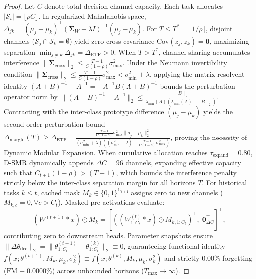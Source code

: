 \documentclass{article}
\begin{document}
\begin{proof}
Let $C$ denote total decision channel capacity. Each task allocates $|\mathcal{S}_t| = \lfloor \rho C \rfloor$. In regularized Mahalanobis space, $\Delta_{jk} = (\mu_j - \mu_k)^\top (\mathbf{\Sigma}_W + \lambda I)^{-1} (\mu_j - \mu_k)$. For $T \le T^* = \lfloor 1/\rho \rfloor$, disjoint channels ($\mathcal{S}_j \cap \mathcal{S}_k = \emptyset$) yield zero cross-covariance $\text{Cov}(z_j, z_k) = \mathbf{0}$, maximizing separation $\min_{j \ne k} \Delta_{jk} = \Delta_{\text{ETF}} > 0$. When $T > T^*$, channel sharing accumulates interference $\|\mathbf{\Sigma}_{\text{cross}}\|_2 \le \frac{T-1}{C(1-\rho)} \sigma_{\max}^2$. Under the Neumann invertibility condition $\|\mathbf{\Sigma}_{\mathrm{cross}}\|_2 \le \frac{T-1}{C(1-\rho)}\sigma_{\max}^2 < \sigma_{\min}^2 + \lambda$, applying the matrix resolvent identity $(A+B)^{-1} - A^{-1} = -A^{-1} B (A+B)^{-1}$ bounds the perturbation operator norm by $\|(A+B)^{-1} - A^{-1}\|_2 \le \frac{\|B\|_2}{\lambda_{\min}(A)(\lambda_{\min}(A) - \|B\|_2)}$. Contracting with the inter-class prototype difference $(\mu_j - \mu_k)$ yields the second-order perturbation bound $\Delta_{\mathrm{margin}}(T) \ge \Delta_{\mathrm{ETF}} - \frac{\frac{T-1}{C(1-\rho)}\sigma_{\max}^2 \|\mu_j - \mu_k\|_2^2}{(\sigma_{\min}^2 + \lambda)((\sigma_{\min}^2 + \lambda) - \frac{T-1}{C(1-\rho)}\sigma_{\max}^2)}$, proving the necessity of Dynamic Modular Expansion. When cumulative allocation reaches $\tau_{\text{expand}} = 0.80$, D-SMR dynamically appends $\Delta C = 96$ channels, expanding effective capacity such that $C_{t+1}(1-\rho) > (T-1)$, which bounds the interference penalty strictly below the inter-class separation margin for all horizons $T$. For historical tasks $k \le t$, cached mask $M_k \in \{0, 1\}^{C_{t+1}}$ assigns zero to new channels ($M_{k, c} = 0, \forall c > C_t$). Masked pre-activations evaluate:
\begin{equation}
(W^{(t+1)} * x) \odot M_k = \left[ \left((W_{1:C_t}^{(t)} * x) \odot M_{k, 1:C_t}\right)^\top, \; \mathbf{0}_{\Delta C}^\top \right]^\top,
\end{equation}
contributing zero to downstream heads. Parameter snapshots ensure $\|\Delta \theta_{\mathrm{dec}}\|_2 = \|\theta_{1:C_t}^{(t+1)} - \theta_{1:C_t}^{(k)}\|_2 \equiv 0$, guaranteeing functional identity $f(x; \theta^{(t+1)}, M_k, \mu_k, \sigma_k^2) \equiv f(x; \theta^{(k)}, M_k, \mu_k, \sigma_k^2)$ and strictly $0.00\%$ forgetting ($\text{FM} \equiv 0.0000\%$) across unbounded horizons ($T_{\max} \to \infty$).
\end{proof}
\end{document}
